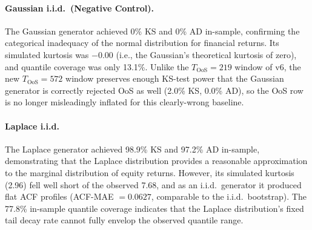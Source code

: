 \paragraph{Gaussian i.i.d.\ (Negative Control).}
The Gaussian generator achieved 0\% KS and 0\% AD in-sample, confirming the categorical inadequacy of the normal distribution for financial returns.
Its simulated kurtosis was $-0.00$ (i.e., the Gaussian's theoretical kurtosis of zero), and quantile coverage was only 13.1\%.
Unlike the $T_{\text{OoS}} = 219$ window of v6, the new $T_{\text{OoS}} = 572$ window preserves enough KS-test power that the Gaussian generator is correctly rejected OoS as well (2.0\% KS, 0.0\% AD), so the OoS row is no longer misleadingly inflated for this clearly-wrong baseline.

\paragraph{Laplace i.i.d.}
The Laplace generator achieved 98.9\% KS and 97.2\% AD in-sample, demonstrating that the Laplace distribution provides a reasonable approximation to the marginal distribution of equity returns.
However, its simulated kurtosis (2.96) fell well short of the observed 7.68, and as an i.i.d.\ generator it produced flat ACF profiles (ACF-MAE $= 0.0627$, comparable to the i.i.d.\ bootstrap).
The 77.8\% in-sample quantile coverage indicates that the Laplace distribution's fixed tail decay rate cannot fully envelop the observed quantile range.

